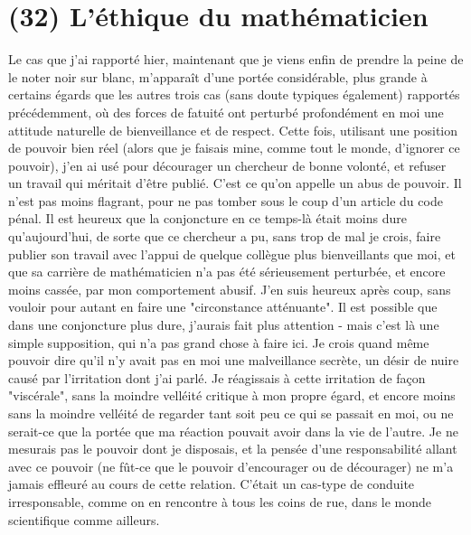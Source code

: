 \section{(32) L'éthique du mathématicien}

Le cas que j'ai rapporté hier, maintenant que je viens enfin de prendre la peine de le noter noir sur blanc, m'apparaît d'une portée considérable, plus grande à certains égards que les autres trois cas (sans doute typiques également) rapportés précédemment, où des forces de fatuité ont perturbé profondément en moi une attitude naturelle de bienveillance et de respect. Cette fois, utilisant une position de pouvoir bien réel (alors que je faisais mine, comme tout le monde, d'ignorer ce pouvoir), j'en ai usé pour décourager un chercheur de bonne volonté, et refuser un travail qui méritait d'être publié. C'est ce qu'on appelle un abus de pouvoir. Il n'est pas moins flagrant, pour ne pas tomber sous le coup d'un article du code pénal. Il est heureux que la conjoncture en ce temps-là était moins dure qu'aujourd'hui, de sorte que ce chercheur a pu, sans trop de mal je crois, faire publier son travail avec l'appui de quelque collègue plus bienveillants que moi, et que sa carrière de mathématicien n'a pas été sérieusement perturbée, et encore moins cassée, par mon comportement abusif. J'en suis heureux après coup, sans vouloir pour autant en faire une "circonstance atténuante". Il est possible que dans une conjoncture plus dure, j'aurais fait plus attention - mais c'est là une simple supposition, qui n'a pas grand chose à faire ici. Je crois quand même pouvoir dire qu'il n'y avait pas en moi une malveillance secrète, un désir de nuire causé par l'irritation dont j'ai parlé. Je réagissais à cette irritation de façon "viscérale", sans la moindre velléité critique à mon propre égard, et encore moins sans la moindre velléité de regarder tant soit peu ce qui se passait en moi, ou ne serait-ce que la portée que ma réaction pouvait avoir dans la vie de l'autre. Je ne mesurais pas le pouvoir dont je disposais, et la pensée d'une responsabilité allant avec ce pouvoir (ne fût-ce que le pouvoir d'encourager ou de décourager) ne m'a jamais effleuré au cours de cette relation. C'était un cas-type de conduite irresponsable, comme on en rencontre à tous les coins de rue, dans le monde scientifique comme ailleurs.

